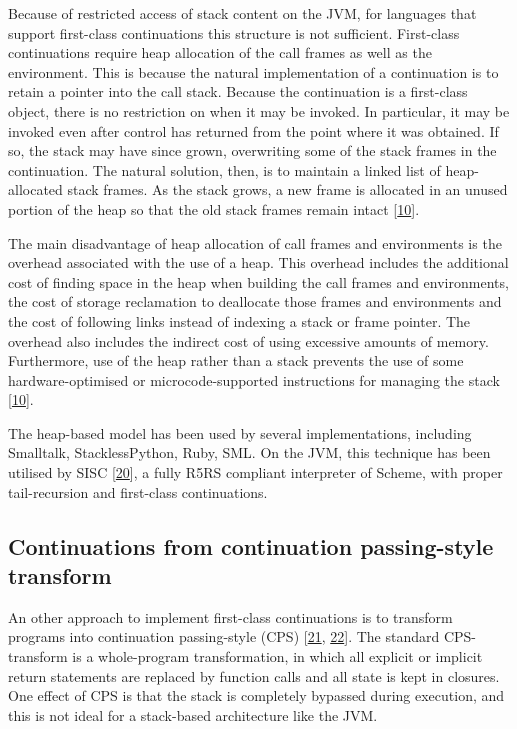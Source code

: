 \documentclass[12pt,a4paper,oneside,openright]{book}
\begin{document}
Because of restricted access of stack content on the JVM, for languages
that support first-class continuations this structure is not sufficient.
First-class continuations require heap allocation of the call frames as
well as the environment. This is because the natural implementation of a
continuation is to retain a pointer into the call stack. Because the
continuation is a first-class object, there is no restriction on when it
may be invoked. In particular, it may be invoked even after control has
returned from the point where it was obtained. If so, the stack may have
since grown, overwriting some of the stack frames in the continuation.
The natural solution, then, is to maintain a linked list of
heap-allocated stack frames. As the stack grows, a new frame is
allocated in an unused portion of the heap so that the old stack frames
remain intact {[}\hyperref[ref-dybvig1987three]{10}{]}.

The main disadvantage of heap allocation of call frames and environments
is the overhead associated with the use of a heap. This overhead
includes the additional cost of finding space in the heap when building
the call frames and environments, the cost of storage reclamation to
deallocate those frames and environments and the cost of following links
instead of indexing a stack or frame pointer. The overhead also includes
the indirect cost of using excessive amounts of memory. Furthermore, use
of the heap rather than a stack prevents the use of some
hardware-optimised or microcode-supported instructions for managing the
stack {[}\hyperref[ref-dybvig1987three]{10}{]}.

The heap-based model has been used by several implementations, including
Smalltalk, StacklessPython, Ruby, SML. On the JVM, this technique has
been utilised by SISC {[}\hyperref[ref-Miller2002]{20}{]}, a fully R5RS
compliant interpreter of Scheme, with proper tail-recursion and
first-class continuations.

\subsection{Continuations from continuation passing-style
transform}\label{continuations-from-continuation-passing-style-transform}

An other approach to implement first-class continuations is to transform
programs into continuation passing-style (CPS)
{[}\hyperref[ref-appel2006compiling]{21},
\hyperref[ref-adams1986orbit]{22}{]}. The standard CPS-transform is a
whole-program transformation, in which all explicit or implicit return
statements are replaced by function calls and all state is kept in
closures. One effect of CPS is that the stack is completely bypassed
during execution, and this is not ideal for a stack-based architecture
like the JVM.
\end{document}
